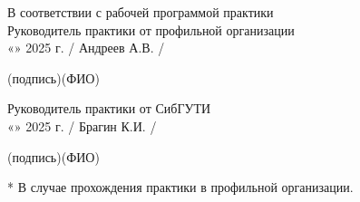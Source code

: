 \vspace{0.8cm}

В соответствии с рабочей программой практики\\
Руководитель практики от профильной организации\\
«\underline{\hspace{1cm}}» \underline{\hspace{2.5cm}} 2025 г. \hfill
\underline{\hspace{4cm}} / Андреев А.В. /

\vspace{0.2cm}
\hfill {\footnotesize (подпись)\hspace{1.2cm}(ФИО)}

\vspace{0.8cm}

Руководитель практики от СибГУТИ\\
«\underline{\hspace{1cm}}» \underline{\hspace{2.5cm}} 2025 г. \hfill
\underline{\hspace{4cm}} / Брагин К.И. /

\vspace{0.2cm}
\hfill {\footnotesize (подпись)\hspace{1.2cm}(ФИО)}

\vfill

{\footnotesize
* В случае прохождения практики в профильной организации.
}

\vfill
\newpage







